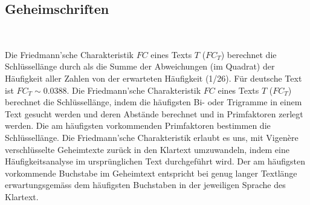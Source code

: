 \begin{questions}
{
\droptotalpoints
}

\section*{Geheimschriften}
\\
\begin{choices}
 \correctchoice Die Friedmann'sche Charakteristik $FC$ eines Texts $T$ ($FC_T$) berechnet die Schlüssellänge durch als die Summe der Abweichungen (im Quadrat) der Häufigkeit aller Zahlen von der erwarteten Häufigkeit (1/26). Für deutsche Text ist $FC_T\sim 0.0388$.
 \choice Die Friedmann'sche Charakteristik $FC$ eines Texts $T$ ($FC_T$) berechnet die Schlüssellänge, indem die häufigsten Bi- oder Trigramme in einem Text gesucht werden und deren Abstände berechnet und in Primfaktoren zerlegt werden. Die am häufigsten vorkommenden Primfaktoren bestimmen die Schlüssellänge.
 \choice Die Friedmann'sche Charakteristik erlaubt es uns, mit Vigenère verschlüsselte Geheimtexte zurück in den Klartext umzuwandeln, indem eine Häufigkeitsanalyse im ursprünglichen Text durchgeführt wird. Der am häufigsten vorkommende Buchstabe im Geheimtext entspricht bei genug langer Textlänge erwartungsgemäss dem häufigsten Buchstaben in der jeweiligen Sprache des Klartext.
\end{choices}
\droptotalpoints

\end{questions}
